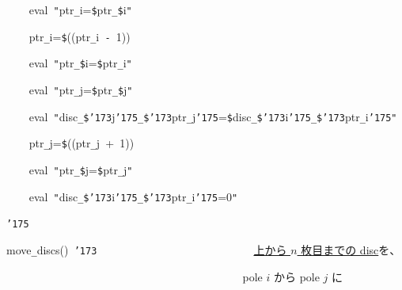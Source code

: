 \documentclass[a4paper,10pt]{article}
\def\mc{\relax}
\begin{document}
\noindent
\mbox{}{\tt\mc \ }{\tt\mc \ }{\tt\mc \ }{\tt\mc \ }eval{\tt\mc \ }{\tt "}ptr{\tt\_}i={\tt{}}{\tt\$}ptr{\tt\_}{\tt\$}i{\tt "}

\noindent
\mbox{}{\tt\mc \ }{\tt\mc \ }{\tt\mc \ }{\tt\mc \ }ptr{\tt\_}i={\tt\$}((ptr{\tt\_}i{\tt\mc \ }{\tt -}{\tt\mc \ }1))

\noindent
\mbox{}{\tt\mc \ }{\tt\mc \ }{\tt\mc \ }{\tt\mc \ }eval{\tt\mc \ }{\tt "}ptr{\tt\_}{\tt\$}i={\tt\$}ptr{\tt\_}i{\tt "}

\noindent
\mbox{}{\tt\mc \ }{\tt\mc \ }{\tt\mc \ }{\tt\mc \ }eval{\tt\mc \ }{\tt "}ptr{\tt\_}j={\tt{}}{\tt\$}ptr{\tt\_}{\tt\$}j{\tt "}

\noindent
\mbox{}{\tt\mc \ }{\tt\mc \ }{\tt\mc \ }{\tt\mc \ }eval{\tt\mc \ }{\tt "}disc{\tt\_}{\tt\$}{\tt\char'173}j{\tt\char'175}{\tt\_}{\tt\$}{\tt\char'173}ptr{\tt\_}j{\tt\char'175}={\tt{}}{\tt\$}disc{\tt\_}{\tt\$}{\tt\char'173}i{\tt\char'175}{\tt\_}{\tt\$}{\tt\char'173}ptr{\tt\_}i{\tt\char'175}{\tt "}

\noindent
\mbox{}{\tt\mc \ }{\tt\mc \ }{\tt\mc \ }{\tt\mc \ }ptr{\tt\_}j={\tt\$}((ptr{\tt\_}j{\tt\mc \ }+{\tt\mc \ }1))

\noindent
\mbox{}{\tt\mc \ }{\tt\mc \ }{\tt\mc \ }{\tt\mc \ }eval{\tt\mc \ }{\tt "}ptr{\tt\_}{\tt\$}j={\tt\$}ptr{\tt\_}j{\tt "}

\noindent
\mbox{}{\tt\mc \ }{\tt\mc \ }{\tt\mc \ }{\tt\mc \ }eval{\tt\mc \ }{\tt "}disc{\tt\_}{\tt\$}{\tt\char'173}i{\tt\char'175}{\tt\_}{\tt\$}{\tt\char'173}ptr{\tt\_}i{\tt\char'175}=0{\tt "}

\noindent
\mbox{}{\tt\char'175}

\noindent
\mbox{}\hfill

\noindent
\mbox{}move{\tt\_}discs(){\tt\mc \ }{\tt\char'173}{\tt\mc \ }{\tt\mc \ }{\tt\mc \ }{\tt\mc \ }{\tt\mc \ }{\tt\mc \ }{\tt\mc \ }{\tt\mc \ }{\tt\mc \ }{\tt\mc \ }{\tt\mc \ }{\tt\mc \ }{\tt\mc \ }{\tt\mc \ }{\tt\mc \ }{\tt\mc \ }{\tt\mc \ }{\tt\mc \ }{\tt\mc \ }{\tt\mc \ }{\tt\mc \ }{\tt\mc \ }{\tt\mc \ }{\tt\mc \ }{\tt\mc \ }{\tt\mc \ }\rm\mc {\tt\#} \ \underline{\textsf{上から $n$ 枚目までの disc}}を、\hfill 
\tt\mc 

\noindent
\mbox{}{\tt\mc \ }{\tt\mc \ }{\tt\mc \ }{\tt\mc \ }{\tt\mc \ }{\tt\mc \ }{\tt\mc \ }{\tt\mc \ }{\tt\mc \ }{\tt\mc \ }{\tt\mc \ }{\tt\mc \ }{\tt\mc \ }{\tt\mc \ }{\tt\mc \ }{\tt\mc \ }{\tt\mc \ }{\tt\mc \ }{\tt\mc \ }{\tt\mc \ }{\tt\mc \ }{\tt\mc \ }{\tt\mc \ }{\tt\mc \ }{\tt\mc \ }{\tt\mc \ }{\tt\mc \ }{\tt\mc \ }{\tt\mc \ }{\tt\mc \ }{\tt\mc \ }{\tt\mc \ }{\tt\mc \ }{\tt\mc \ }{\tt\mc \ }{\tt\mc \ }{\tt\mc \ }{\tt\mc \ }{\tt\mc \ }{\tt\mc \ }\rm\mc {\tt\#} \ pole $i$ から pole $j$ に\hfill 
\tt\mc 
\end{document}
